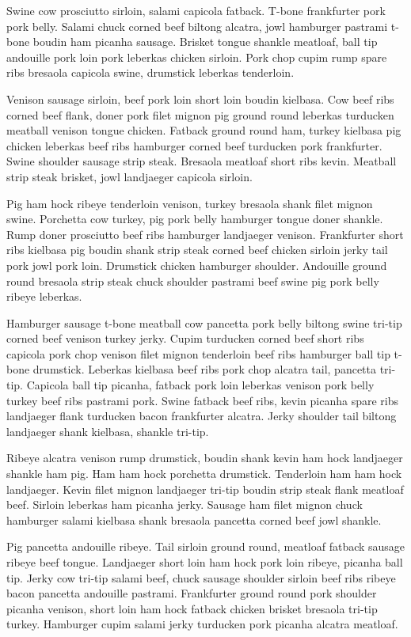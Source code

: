 Swine cow prosciutto sirloin, salami capicola fatback. T-bone frankfurter pork pork belly. Salami chuck corned beef biltong alcatra, jowl hamburger pastrami t-bone boudin ham picanha sausage. Brisket tongue shankle meatloaf, ball tip andouille pork loin pork leberkas chicken sirloin. Pork chop cupim rump spare ribs bresaola capicola swine, drumstick leberkas tenderloin.

Venison sausage sirloin, beef pork loin short loin boudin kielbasa. Cow beef ribs corned beef flank, doner pork filet mignon pig ground round leberkas turducken meatball venison tongue chicken. Fatback ground round ham, turkey kielbasa pig chicken leberkas beef ribs hamburger corned beef turducken pork frankfurter. Swine shoulder sausage strip steak. Bresaola meatloaf short ribs kevin. Meatball strip steak brisket, jowl landjaeger capicola sirloin.

Pig ham hock ribeye tenderloin venison, turkey bresaola shank filet mignon swine. Porchetta cow turkey, pig pork belly hamburger tongue doner shankle. Rump doner prosciutto beef ribs hamburger landjaeger venison. Frankfurter short ribs kielbasa pig boudin shank strip steak corned beef chicken sirloin jerky tail pork jowl pork loin. Drumstick chicken hamburger shoulder. Andouille ground round bresaola strip steak chuck shoulder pastrami beef swine pig pork belly ribeye leberkas.

Hamburger sausage t-bone meatball cow pancetta pork belly biltong swine tri-tip corned beef venison turkey jerky. Cupim turducken corned beef short ribs capicola pork chop venison filet mignon tenderloin beef ribs hamburger ball tip t-bone drumstick. Leberkas kielbasa beef ribs pork chop alcatra tail, pancetta tri-tip. Capicola ball tip picanha, fatback pork loin leberkas venison pork belly turkey beef ribs pastrami pork. Swine fatback beef ribs, kevin picanha spare ribs landjaeger flank turducken bacon frankfurter alcatra. Jerky shoulder tail biltong landjaeger shank kielbasa, shankle tri-tip.

Ribeye alcatra venison rump drumstick, boudin shank kevin ham hock landjaeger shankle ham pig. Ham ham hock porchetta drumstick. Tenderloin ham ham hock landjaeger. Kevin filet mignon landjaeger tri-tip boudin strip steak flank meatloaf beef. Sirloin leberkas ham picanha jerky. Sausage ham filet mignon chuck hamburger salami kielbasa shank bresaola pancetta corned beef jowl shankle.

Pig pancetta andouille ribeye. Tail sirloin ground round, meatloaf fatback sausage ribeye beef tongue. Landjaeger short loin ham hock pork loin ribeye, picanha ball tip. Jerky cow tri-tip salami beef, chuck sausage shoulder sirloin beef ribs ribeye bacon pancetta andouille pastrami. Frankfurter ground round pork shoulder picanha venison, short loin ham hock fatback chicken brisket bresaola tri-tip turkey. Hamburger cupim salami jerky turducken pork picanha alcatra meatloaf.

